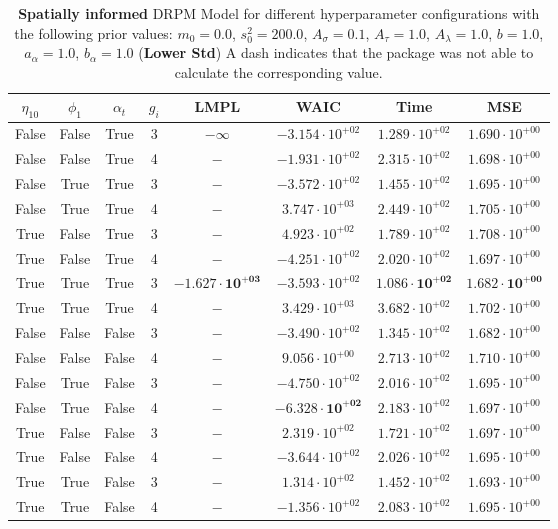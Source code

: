 \documentclass[12pt,a4paper]{article}
\begin{document}
\begin{table}
\caption{\textbf{Spatially informed} DRPM Model for different hyperparameter configurations with the following prior values: $m_0 = 0.0$, $s_0^2 
= 200.0$, $A_\sigma = 0.1$, $A_\tau = 1.0$, $A_\lambda = 1.0$, $b = 1.0$, $a_\alpha = 1.0$, $b_\alpha = 1.0$ (\textbf{Lower Std})
A dash indicates that the package was not able to calculate the corresponding value.}
\centering\begin{tabular}{cccccccc}
\toprule
$\eta_{10}$ & $\phi_1$ & $\alpha_t$ & $g_i$ & LMPL & WAIC & Time & MSE \\
\midrule
False & False & True & 3 & $-\infty$ & $-3.154 \cdot 10^{+02}$ & $1.289 \cdot 10^{+02}$ & $1.690 \cdot 10^{+00}$ \\
False & False & True & 4 & $-$ & $-1.931 \cdot 10^{+02}$ & $2.315 \cdot 10^{+02}$ & $1.698 \cdot 10^{+00}$ \\
False & True & True & 3 & $-$ & $-3.572 \cdot 10^{+02}$ & $1.455 \cdot 10^{+02}$ & $1.695 \cdot 10^{+00}$ \\
False & True & True & 4 & $-$ & $3.747 \cdot 10^{+03}$ & $2.449 \cdot 10^{+02}$ & $1.705 \cdot 10^{+00}$ \\
True & False & True & 3 & $-$ & $4.923 \cdot 10^{+02}$ & $1.789 \cdot 10^{+02}$ & $1.708 \cdot 10^{+00}$ \\
True & False & True & 4 & $-$ & $-4.251 \cdot 10^{+02}$ & $2.020 \cdot 10^{+02}$ & $1.697 \cdot 10^{+00}$ \\
True & True & True & 3 & $\mathbf{-1.627 \cdot 10^{+03}}$ & $-3.593 \cdot 10^{+02}$ & $\mathbf{1.086 \cdot 10^{+02}}$ & $\mathbf{1.682 \cdot 10^{+00}}$ \\
True & True & True & 4 & $-$ & $3.429 \cdot 10^{+03}$ & $3.682 \cdot 10^{+02}$ & $1.702 \cdot 10^{+00}$ \\
False & False & False & 3 & $-$ & $-3.490 \cdot 10^{+02}$ & $1.345 \cdot 10^{+02}$ & $1.682 \cdot 10^{+00}$ \\
False & False & False & 4 & $-$ & $9.056 \cdot 10^{+00}$ & $2.713 \cdot 10^{+02}$ & $1.710 \cdot 10^{+00}$ \\
False & True & False & 3 & $-$ & $-4.750 \cdot 10^{+02}$ & $2.016 \cdot 10^{+02}$ & $1.695 \cdot 10^{+00}$ \\
False & True & False & 4 & $-$ & $\mathbf{-6.328 \cdot 10^{+02}}$ & $2.183 \cdot 10^{+02}$ & $1.697 \cdot 10^{+00}$ \\
True & False & False & 3 & $-$ & $2.319 \cdot 10^{+02}$ & $1.721 \cdot 10^{+02}$ & $1.697 \cdot 10^{+00}$ \\
True & False & False & 4 & $-$ & $-3.644 \cdot 10^{+02}$ & $2.026 \cdot 10^{+02}$ & $1.695 \cdot 10^{+00}$ \\
True & True & False & 3 & $-$ & $1.314 \cdot 10^{+02}$ & $1.452 \cdot 10^{+02}$ & $1.693 \cdot 10^{+00}$ \\
True & True & False & 4 & $-$ & $-1.356 \cdot 10^{+02}$ & $2.083 \cdot 10^{+02}$ & $1.695 \cdot 10^{+00}$ \\
\bottomrule
\end{tabular}
\label{tab:DRPMExtensionLowerStd}
\end{table}
\end{document}
